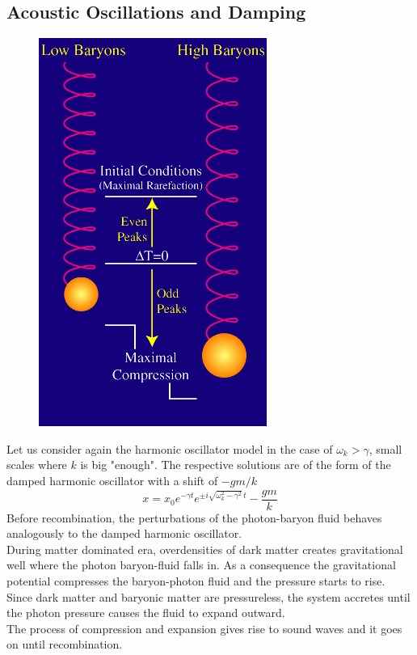\documentclass{article}
\begin{document}
\subsection{Acoustic Oscillations and Damping}
\begin{figure}
\centering
\includegraphics[scale=0.5]{baryonspring}
\end{figure}
Let us consider again the harmonic oscillator model in the case of $\omega_k > \gamma$, small scales where $k$ is big "enough".
The respective solutions are of the form of the damped harmonic oscillator with a shift of $-gm/k$
\[
x = x_0 e^{-\gamma t} e^{\pm i \sqrt{\omega_k ^2 - \gamma ^2} \, t} - \dfrac{g m}{k}
\]
Before recombination, the perturbations of the photon-baryon fluid behaves analogously to the damped harmonic oscillator.\\
During matter dominated era, overdensities of dark matter creates gravitational well where the photon baryon-fluid falls in.
As a consequence the gravitational potential compresses the baryon-photon fluid and the pressure starts to rise.
Since dark matter and baryonic matter are pressureless, the system accretes until the photon pressure causes the fluid to expand outward.\\
The process of compression and expansion gives rise to sound waves and it goes on until recombination.
\end{document}

